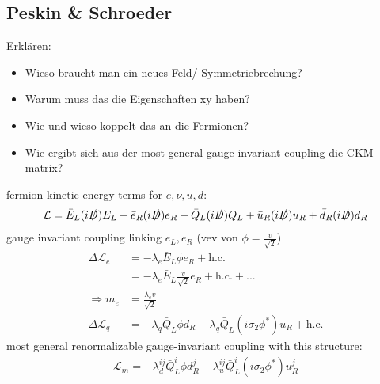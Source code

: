 \subsection{Peskin \& Schroeder}
Erklären:
\begin{itemize}
	\item Wieso braucht man ein neues Feld/ Symmetriebrechung?
	\item Warum muss das die Eigenschaften xy haben?
	\item Wie und wieso koppelt das an die Fermionen?
	\item Wie ergibt sich aus der most general gauge-invariant coupling die CKM matrix?
\end{itemize}
fermion kinetic energy terms for $e,\nu,u,d$:
\begin{align}
	\mathcal{L} = \bar{E}_L(i\slashed{D})E_L + \bar{e}_R(i\slashed{D})e_R + \bar{Q}_L(i\slashed{D})Q_L + \bar{u}_R(i\slashed{D})u_R + \bar{d}_R(i\slashed{D})d_R
\end{align}
gauge invariant coupling linking $e_L,e_R$ (vev von $\phi=\frac{v}{\sqrt{2}}$)
\begin{align}
	\Delta\mathcal{L}_e &= -\lambda_e\bar{E}_L\phi e_R + \text{h.c.} \\
	&= -\lambda_e\bar{E}_L\frac{v}{\sqrt{2}} e_R + \text{h.c.} + ... \\
	\Rightarrow m_e &= \frac{\lambda_ev}{\sqrt{2}} \\
	\Delta\mathcal{L}_q &= - \lambda_q\bar{Q}_L\phi d_R - \lambda_q\bar{Q}_L(i\sigma_2\phi^*) u_R + \text{h.c.}
\end{align}
most general renormalizable gauge-invariant coupling with this structure:
\begin{align}
	\mathcal{L}_m = -\lambda_d^{ij}\bar{Q}_L^i\phi d_R^j - \lambda_u^{ij}\bar{Q}_L^i(i\sigma_2\phi^*) u_R^j
\end{align}
